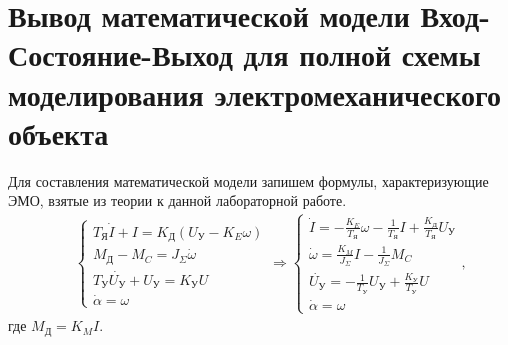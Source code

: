 \documentclass[fleqn, a4paper, 11pt, russian]{article}
\begin{document}
	\section{Вывод математической модели Вход-Состояние-Выход для полной схемы моделирования электромеханического объекта}
	Для составления математической модели запишем формулы, характеризующие ЭМО, взятые из теории к данной лабораторной работе.
	\begin{align}
		&&\begin{cases}
			T_\text{Я}\dot{I} + I = K_\text{Д}(U_\text{У} - K_E\omega)\\
			M_\text{Д} - M_C = J_\Sigma\dot{\omega}\\
			T_\text{У}\dot{U_\text{У}} + U_\text{У} = K_\text{У}U\\
			\dot{\alpha} = \omega
		\end{cases}
		\Rightarrow
		\begin{cases}
			\dot{I} = -\displaystyle{\frac{K_E}{T_\text{Я}}}\omega - \frac{1}{T_\text{Я}}I + \frac{K_\text{Д}}{T_\text{Я}}U_\text{У}\\
			\dot{\omega} = \displaystyle{\frac{K_M}{J_\Sigma}}I - \frac{1}{J_\Sigma}M_C\\
			\dot{U_\text{У}} = -\displaystyle{\frac{1}{T_\text{У}}U_\text{У}} + \frac{K_\text{У}}{T_\text{У}}U\\
			\dot{\alpha} = \omega
		\end{cases}
		,
		\label{ESETh}
	\end{align}
	где $M_\text{Д} = K_MI$.
	
\end{document}
